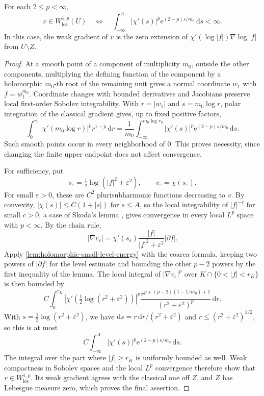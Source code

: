 \begin{proposition}\label{prop:divisorial-first-sobolev}
For each $2\leq p<\infty$,
\[
 v\in W^{1,p}_{\mathrm{loc}}(U)
 \quad\Longleftrightarrow\quad
 \int_{-\infty}^A|\chi'(s)|^p
          \mathrm e^{(2-p)s/m_0}\,\mathrm ds<\infty.
\]
In this case, the weak gradient of $v$ is the zero extension of
$\chi'(\log|f|)\nabla\log|f|$ from $U\setminus Z$.
\end{proposition}
\begin{proof}
At a smooth point of a component of multiplicity $m_0$, outside the other components, multiplying the defining function of the component by a holomorphic $m_0$-th root of the remaining unit gives a normal coordinate $w_1$ with $f=w_1^{m_0}$. Coordinate changes with bounded derivatives and Jacobians preserve local first-order Sobolev integrability. With $r=|w_1|$ and $s=m_0\log r$, polar integration of the classical gradient gives, up to fixed positive factors,
\[
 \int_0^{r_0}|\chi'(m_0\log r)|^p r^{1-p}\,\mathrm dr
 =\frac1{m_0}\int_{-\infty}^{m_0\log r_0}
       |\chi'(s)|^p\mathrm e^{(2-p)s/m_0}\,\mathrm ds.
\]
Such smooth points occur in every neighborhood of $0$. This proves necessity, since changing the finite upper endpoint does not affect convergence.

For sufficiency, put
\[
 s_\varepsilon=\tfrac12\log(|f|^2+\varepsilon^2),
 \qquad v_\varepsilon=\chi(s_\varepsilon).
\]
For small $\varepsilon>0$, these are $C^2$ plurisubharmonic functions decreasing to $v$. By convexity, $|\chi(s)|\leq C(1+|s|)$ for $s\leq A$, so the local integrability of $|f|^{-c}$ for small $c>0$, a case of Skoda's lemma \cite[Lemma~5.6]{DemAM11}, gives convergence in every local $L^p$ space with $p<\infty$. By the chain rule,
\[
 |\nabla v_\varepsilon|
 =\chi'(s_\varepsilon)
       \frac{|f|}{|f|^2+\varepsilon^2}|\partial f|.
\]
Apply \cref{lem:holomorphic-small-level-energy} with the coarea formula, keeping two powers of $|\partial f|$ for the level estimate and bounding the other $p-2$ powers by the first inequality of the lemma. The local integral of $|\nabla v_\varepsilon|^p$ over $K\cap\{0<|f|<r_K\}$ is then bounded by
\[
 C\int_0^{r_K}
  |\chi'(\tfrac12\log(r^2+\varepsilon^2))|^p
  \frac{r^{p+(p-2)(1-1/m_0)+1}}{(r^2+\varepsilon^2)^p}
       \,\mathrm dr.
\]
With $s=\tfrac12\log(r^2+\varepsilon^2)$, we have $\mathrm ds=r\,\mathrm dr/(r^2+\varepsilon^2)$ and $r\leq(r^2+\varepsilon^2)^{1/2}$, so this is at most
\[
 C\int_{-\infty}^A|\chi'(s)|^p
         \mathrm e^{(2-p)s/m_0}\,\mathrm ds.
\]
The integral over the part where $|f|\geq r_K$ is uniformly bounded as well. Weak compactness in Sobolev spaces and the local $L^p$ convergence therefore show that $v\in W^{1,p}_{\mathrm{loc}}$. Its weak gradient agrees with the classical one off $Z$, and $Z$ has Lebesgue measure zero, which proves the final assertion.
\end{proof}

